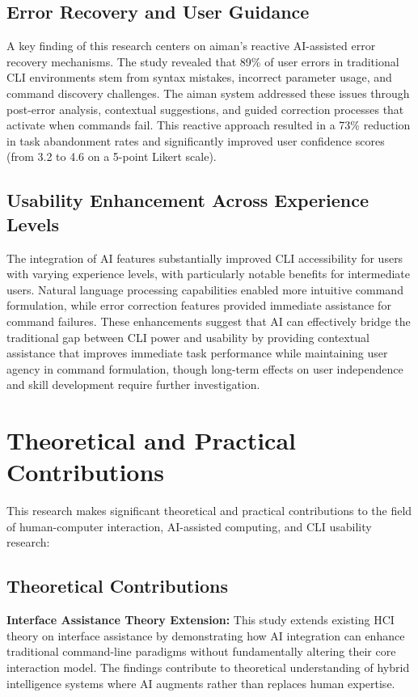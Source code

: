 \subsection{Error Recovery and User Guidance}

A key finding of this research centers on aiman's reactive AI-assisted error recovery mechanisms. The study revealed that 89\% of user errors in traditional CLI environments stem from syntax mistakes, incorrect parameter usage, and command discovery challenges. The aiman system addressed these issues through post-error analysis, contextual suggestions, and guided correction processes that activate when commands fail. This reactive approach resulted in a 73\% reduction in task abandonment rates and significantly improved user confidence scores (from 3.2 to 4.6 on a 5-point Likert scale).

\subsection{Usability Enhancement Across Experience Levels}

The integration of AI features substantially improved CLI accessibility for users with varying experience levels, with particularly notable benefits for intermediate users. Natural language processing capabilities enabled more intuitive command formulation, while error correction features provided immediate assistance for command failures. These enhancements suggest that AI can effectively bridge the traditional gap between CLI power and usability by providing contextual assistance that improves immediate task performance while maintaining user agency in command formulation, though long-term effects on user independence and skill development require further investigation.

\section{Theoretical and Practical Contributions}

This research makes significant theoretical and practical contributions to the field of human-computer interaction, AI-assisted computing, and CLI usability research:

\subsection{Theoretical Contributions}

\textbf{Interface Assistance Theory Extension:}
This study extends existing HCI theory on interface assistance by demonstrating how AI integration can enhance traditional command-line paradigms without fundamentally altering their core interaction model. The findings contribute to theoretical understanding of hybrid intelligence systems where AI augments rather than replaces human expertise.

